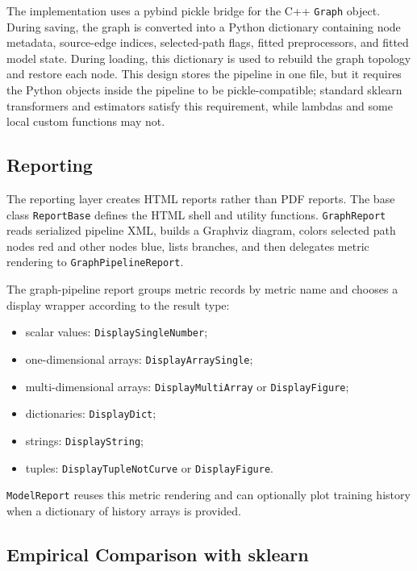 \documentclass[11pt,a4paper]{article}
\begin{document}
The implementation uses a pybind pickle bridge for the C++ \texttt{Graph}
object. During saving, the graph is converted into a Python dictionary
containing node metadata, source-edge indices, selected-path flags, fitted
preprocessors, and fitted model state. During loading, this dictionary is used
to rebuild the graph topology and restore each node. This design stores the
pipeline in one file, but it requires the Python objects inside the pipeline to
be pickle-compatible; standard sklearn transformers and estimators satisfy
this requirement, while lambdas and some local custom functions may not.

\subsection{Reporting}

The reporting layer creates HTML reports rather than PDF reports. The base
class \texttt{ReportBase} defines the HTML shell and utility functions.
\texttt{GraphReport} reads serialized pipeline XML, builds a Graphviz diagram,
colors selected path nodes red and other nodes blue, lists branches, and then
delegates metric rendering to \texttt{GraphPipelineReport}.

The graph-pipeline report groups metric records by metric name and chooses a
display wrapper according to the result type:

\begin{itemize}[leftmargin=*]
  \item scalar values: \texttt{DisplaySingleNumber};
  \item one-dimensional arrays: \texttt{DisplayArraySingle};
  \item multi-dimensional arrays: \texttt{DisplayMultiArray} or
        \texttt{DisplayFigure};
  \item dictionaries: \texttt{DisplayDict};
  \item strings: \texttt{DisplayString};
  \item tuples: \texttt{DisplayTupleNotCurve} or \texttt{DisplayFigure}.
\end{itemize}

\texttt{ModelReport} reuses this metric rendering and can optionally plot
training history when a dictionary of history arrays is provided.

\subsection{Empirical Comparison with sklearn}
\end{document}
